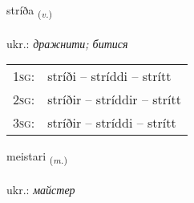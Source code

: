 \documentclass[frontgrid, backgrid]{flacards}\usepackage[]{graphicx}\usepackage[]{xcolor}
\begin{document}
\renewcommand{\flhead}{\vskip5pt \fboxsep=0pt {\small\bfseries\footnotesize Sagnorð | дієслово}}
\renewcommand{\fcfoot}{\vskip5pt \fboxsep=0pt \hspace{2pt}{\small\bfseries\footnotesize 3K}}

\renewcommand{\blhead}{\vskip5pt {\small\bfseries\footnotesize Sagnorð | дієслово }}
\renewcommand{\bcfoot}{\vskip5pt \hspace{2pt}{\small\bfseries\footnotesize 3K}}


{stríða \small{\textsubscript{(\textit{v.})}} \\[1ex] %
\textphonetic{[striːða]} \\
ukr.: \emph{дражнити; битися} \\  [2ex]
\renewcommand*{\arraystretch}{0.8}
\begin{tabular}{p{1cm}l}
\textsc{1sg}: & stríði -- stríddi -- strítt \\ 
\textsc{2sg}: & stríðir -- stríddir -- strítt \\ 
\textsc{3sg}: & stríðir -- stríddi -- strítt \\ 
\end{tabular}
}

\renewcommand{\flhead}{\vskip5pt \fboxsep=0pt {\small\bfseries\footnotesize Nafnorð | іменник}}
\renewcommand{\fcfoot}{\vskip5pt \fboxsep=0pt \hspace{2pt}{\small\bfseries\footnotesize 3K}}

\renewcommand{\blhead}{\vskip5pt {\small\bfseries\footnotesize Nafnorð | іменник }}
\renewcommand{\bcfoot}{\vskip5pt \hspace{2pt}{\small\bfseries\footnotesize 3K}}


{meistari \small{\textsubscript{(\textit{m.})}} \\[1ex] %
\textphonetic{[meistarɪ]} \\
ukr.: \emph{майстер} \\  [2ex]
\renewcommand*{\arraystretch}{0.8}
}
\end{document}
